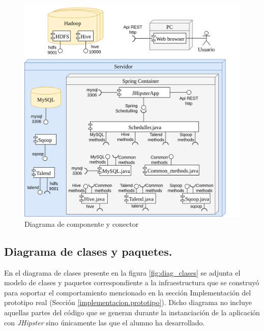 \begin{figure}[H]
    \centering
    \includegraphics[width=\textwidth,height=\textheight,keepaspectratio]{Imagenes/cyc}
    \caption{Diagrama de componente y conector}
    \label{fig:cyc}
\end{figure}


\subsection{Diagrama de clases y paquetes.} \label{disenyo.arquitectura.clases}
 En el diagrama de clases presente en la figura \ref{fig:diag_clases} se adjunta el modelo de clases y paquetes correspondiente a la infraestructura que se construyó para soportar el comportamiento mencionado en la sección Implementación del prototipo real (Sección  \ref{implementacion.prototipo}). Dicho diagrama no incluye aquellas partes del código que se generan durante la instanciación de la aplicación con \textit{JHipster} sino únicamente las que el alumno ha desarrollado. 


